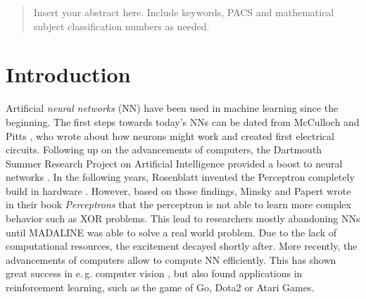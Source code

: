     \date{Received: date / Accepted: date}

    \maketitle

    \begin{abstract}
        Insert your abstract here. Include keywords, PACS and mathematical
        subject classification numbers as needed.
    \end{abstract}

    \section{Introduction \label{sec:intro}}
    Artificial \textit{neural networks} (NN) have been used in machine learning since the beginning. 
    The first steps towards today's NNs can be dated from McCulloch and Pitts \cite{McCulloch1943}, who wrote about how neurons might work and created first electrical circuits.
    Following up on the advancements of computers, the Dartmouth Summer Research Project on Artificial Intelligence provided a boost to neural networks \cite{McCarthy2006}.
    In the following years, Rosenblatt invented the Perceptron completely build in hardware \cite{Rosenblatt1958}.  
    However, based on those findings, Minsky and Papert wrote in their book \textit{Perceptrons} \cite{Minsky2017} that the perceptron is not able to learn more complex behavior such as XOR problems.
    This lead to researchers mostly abandoning NNs until MADALINE \cite{Winter1988} was able to solve a real world problem.
    Due to the lack of computational resources, the excitement decayed shortly after.
    More recently, the advancements of computers allow to compute NN efficiently.
    This has shown great success in e.\,g. computer vision \cite{Krizhevsky2012,He2016}, but also found applications in reinforcement learning, such as the game of Go\cite{Silver2017}, Dota2 \cite{OpenAI2017} or Atari Games\cite{Mnih2015}.
    
